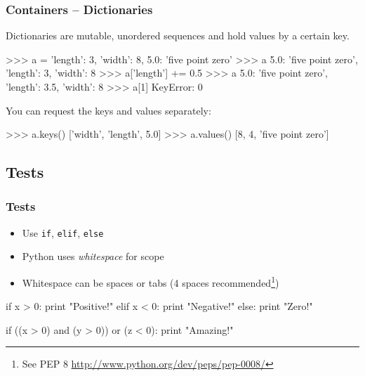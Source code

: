 \documentclass[xetex,10pt]{beamer}
\def\spacer{\vspace*{1em}}
\def\pythoni{\lstinline[language=pythontim]}
\begin{document}
\begin{frame}[fragile]
	\frametitle{Containers -- Dictionaries}

Dictionaries are mutable, unordered sequences and hold values by a certain key.
\begin{python}
>>> a = {'length': 3, 'width': 8, 5.0: 'five point zero'}
>>> a
{5.0: 'five point zero', 'length': 3, 'width': 8}
>>> a['length'] += 0.5
>>> a
{5.0: 'five point zero', 'length': 3.5, 'width': 8}
>>> a[1]
KeyError: 0
\end{python}


	\spacer
	\pause
You can request the keys and values separately:

\begin{python}
>>> a.keys()
['width', 'length', 5.0]
>>> a.values()
[8, 4, 'five point zero']
\end{python}

\end{frame}

\subsection{Tests}

\begin{frame}[fragile]
	\frametitle{Tests}

	\begin{itemize}
	\item Use \pythoni{if}, \pythoni{elif}, \pythoni{else}
	\item Python uses \emph{whitespace} for scope
	\item Whitespace can be spaces or tabs (4 spaces recommended\footnote[frame]{See PEP 8 \url{http://www.python.org/dev/peps/pep-0008/}})
	\end{itemize}
\pause

\begin{python}
if x > 0:
    print "Positive!"
elif x < 0:
    print "Negative!"
else:
    print "Zero!"
\end{python}

	\spacer
\pause

\begin{python}
if ((x > 0) and (y > 0)) or (z < 0):
    print "Amazing!"
\end{python}

\end{frame}
\end{document}
